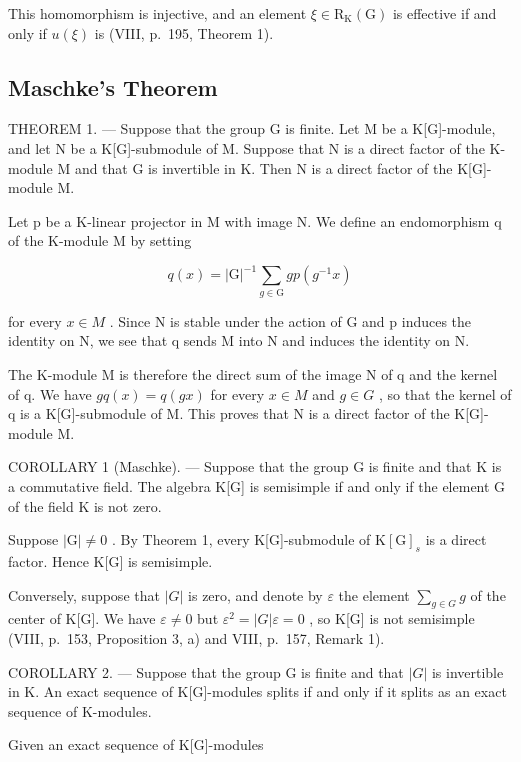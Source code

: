 This homomorphism is injective, and an element \(\xi \in \mathrm{R}_{\mathrm{K}}(\mathrm{G})\) is effective if and only if \(u(\xi)\) is (VIII, p.~195, Theorem 1).

\subsection{Maschke's Theorem}

THEOREM 1. --- Suppose that the group G is finite. Let M be a K{[}G{]}-module, and let N be a K{[}G{]}-submodule of M. Suppose that N is a direct factor of the K-module M and that \textbar G\textbar{} is invertible in K. Then N is a direct factor of the K{[}G{]}-module M.

Let p be a K-linear projector in M with image N. We define an endomorphism q of the K-module M by setting

\[
q (x) = | \mathrm{G} | ^ {- 1} \sum_ {g \in \mathrm{G}} g p (g ^ {- 1} x)
\]

for every \(x \in M\) . Since N is stable under the action of G and p induces the identity on N, we see that q sends M into N and induces the identity on N.

The K-module M is therefore the direct sum of the image N of q and the kernel of q. We have \(g q(x) = q(gx)\) for every \(x \in M\) and \(g \in G\) , so that the kernel of q is a K{[}G{]}-submodule of M. This proves that N is a direct factor of the K{[}G{]}-module M.

COROLLARY 1 (Maschke). --- Suppose that the group G is finite and that K is a commutative field. The algebra K{[}G{]} is semisimple if and only if the element \textbar G\textbar{} of the field K is not zero.

Suppose \(|\mathrm{G}| \neq 0\) . By Theorem 1, every K{[}G{]}-submodule of \(\mathrm{K}[\mathrm{G}]_s\) is a direct factor. Hence K{[}G{]} is semisimple.

Conversely, suppose that \(|G|\) is zero, and denote by \(\varepsilon\) the element \(\sum_{g\in G} g\) of the center of K{[}G{]}. We have \(\varepsilon \neq 0\) but \(\varepsilon^{2} = |G|\varepsilon = 0\) , so K{[}G{]} is not semisimple (VIII, p.~153, Proposition 3, a) and VIII, p.~157, Remark 1).

COROLLARY 2. --- Suppose that the group G is finite and that \(|G|\) is invertible in K. An exact sequence of K{[}G{]}-modules splits if and only if it splits as an exact sequence of K-modules.

Given an exact sequence of K{[}G{]}-modules

